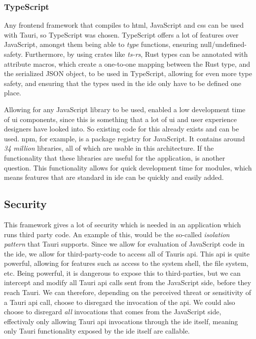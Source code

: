 \subsubsection{TypeScript}

Any frontend framework that compiles to \gls*{html}, JavaScript and \gls*{css} can
be used with Tauri, so TypeScript was chosen. TypeScript offers a lot of
features over JavaScript, amongst them being able to \textit{type} functions,
ensuring null/undefined-safety. Furthermore, by using crates like
\textit{ts-rs}, Rust types can be annotated with attribute macros, which create
a one-to-one mapping between the Rust type, and the serialized JSON object, to
be used in TypeScript, allowing for even more type safety, and ensuring that the
types used in the \gls*{ide} only have to be defined one place.

Allowing for any JavaScript library to be used, enabled a low development time
of \gls*{ui} components, since this is something that a lot of \gls*{ui} and user
experience designers have looked into. So existing code for this already exists
and can be used. \gls*{npm}, for example, is a package registry for JavaScript.
It contains around \textit{34 million} libraries, all of which are usable in
this architecture. If the functionality that these libraries are useful for the
application, is another question. This functionality allows for quick
development time for modules, which means features that are standard in
\gls*{ide} can be quickly and easily added.

\subsection{Security}

This framework gives a lot of security which is needed in an
application which runs third party code. An example of this, would be the
so-called \textit{isolation pattern} that Tauri supports. Since we allow for
evaluation of JavaScript code in the \gls*{ide}, we allow for third-party-code to
access all of Tauris \gls*{api}. This \gls*{api} is quite powerful, allowing for
features such as access to the system shell, the file system, etc. Being
powerful, it is dangerous to expose this to third-parties, but we can
intercept and modify all Tauri \gls*{api} calls sent from the JavaScript side,
before they reach Tauri. We can therefore, depending on the perceived threat or
sensitivity of a Tauri \gls*{api} call, choose to disregard the invocation of the
\gls*{api}. We could also choose to disregard \textit{all} invocations that comes
from the JavaScript side, effectivaly only allowing Tauri \gls*{api} invocations
through the \gls*{ide} itself, meaning only Tauri functionality exposed by the
\gls*{ide} itself are callable.

